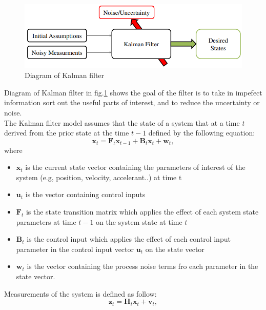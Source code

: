 \begin{figure}[h!]
        \centering
        \includegraphics[width=\textwidth]{Chapters/Fig/kalman_dig.png}
        \caption{Diagram of Kalman filter}
        \label{fig:kalman_dig}
\end{figure}
Diagram of Kalman filter in fig.\ref{fig:kalman_dig} shows the goal of the filter is to take in impefect information sort out the useful parts of interest, and to reduce the uncertainty or noise.\\
The Kalman filter model assumes that the state of a system that at a time $t$ derived from the prior state at the time $t-1$ defined by the following equation:
\begin{displaymath}
 \textbf{x}_t = \textbf{F}_t \textbf{x}_{t-1} + \textbf{B}_t \textbf{x}_t + \textbf{w}_t,
\end{displaymath}
where
\begin{itemize}
    \item $\textbf{x}_t$ is the current state vector containing the parameters of interest of the system (e.g, position, velocity, accelerant..) at time t
    \item $\textbf{u}_t$ is the vector containing control inputs
    \item $\textbf{F}_t$ is the state transition matrix which applies the effect of each system state parameters at time $t-1$ on the system state at time $t$
    \item $\textbf{B}_t$ is the control input which applies the effect of each control input parameter in the control input vector $\textbf{u}_t$ on the state vector
    \item $\textbf{w}_t$ is the vector containing the process noise terms fro each parameter in the state vector.
\end{itemize}
\pagebreak
Measurements of the system is defined as follow:
\begin{displaymath}
         \textbf{z}_t = \textbf{H}_t\textbf{x}_t + \textbf{v}_t,
\end{displaymath}

